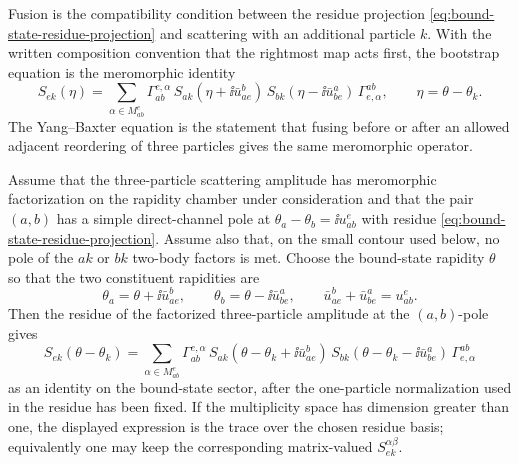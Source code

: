 Fusion is the compatibility condition between the residue projection
\eqref{eq:bound-state-residue-projection} and scattering with an additional
particle \(k\).  With the written composition convention that the rightmost
map acts first, the bootstrap equation is the meromorphic identity
\[
  S_{ek}(\eta)
  =
  \sum_{\alpha\in M_{ab}^{e}}
  \Gamma_{ab}^{e,\alpha}\,
  S_{ak}(\eta+\ii\bar u_{ae}^{b})\,
  S_{bk}(\eta-\ii\bar u_{be}^{a})\,
  \Gamma_{e,\alpha}^{ab},
  \qquad
  \eta=\theta-\theta_k .
\]
The Yang--Baxter equation is the statement that fusing before or after an
allowed adjacent reordering of three particles gives the same meromorphic
operator.

\begin{proposition}
\label{prop:fusion-identity-residue-derivation}
Assume that the three-particle scattering amplitude has meromorphic
factorization on the rapidity chamber under consideration and that the pair
\((a,b)\) has a simple direct-channel pole at
\(\theta_a-\theta_b=\ii u_{ab}^e\) with residue
\eqref{eq:bound-state-residue-projection}.  Assume also that, on the small
contour used below, no pole of the \(ak\) or \(bk\) two-body factors is met.
Choose the bound-state rapidity \(\theta\) so that the two constituent
rapidities are
\[
  \theta_a=\theta+\ii\bar u_{ae}^{b},
  \qquad
  \theta_b=\theta-\ii\bar u_{be}^{a},
  \qquad
  \bar u_{ae}^{b}+\bar u_{be}^{a}=u_{ab}^{e}.
\]
Then the residue of the factorized three-particle amplitude at the
\((a,b)\)-pole gives
\[
  S_{ek}(\theta-\theta_k)
  =
  \sum_{\alpha\in M_{ab}^{e}}
  \Gamma_{ab}^{e,\alpha}\,
  S_{ak}(\theta-\theta_k+\ii\bar u_{ae}^{b})\,
  S_{bk}(\theta-\theta_k-\ii\bar u_{be}^{a})\,
  \Gamma_{e,\alpha}^{ab}
\]
as an identity on the bound-state sector, after the one-particle
normalization used in the residue has been fixed.  If the multiplicity space
has dimension greater than one, the displayed expression is the trace over
the chosen residue basis; equivalently one may keep the corresponding
matrix-valued \(S_{ek}^{\alpha\beta}\).
\end{proposition}

